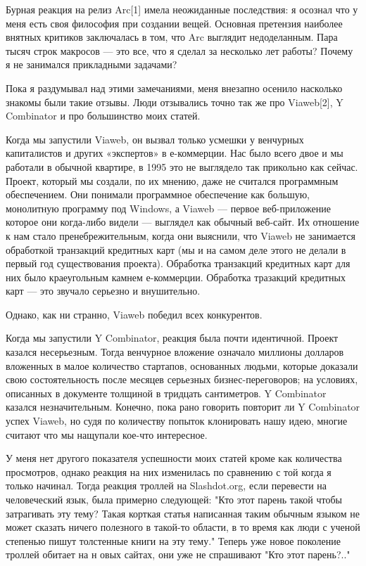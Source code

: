 \documentclass[ebook,12pt,oneside,openany]{memoir}
\author{Пол Грэм} \date{}
\begin{document}
\maketitle

Бурная реакция на релиз Arc[1] имела неожиданные последствия: я
осознал что у меня есть своя философия при создании вещей. Основная
претензия наиболее внятных критиков заключалась в том, что Arc
выглядит недоделанным. Пара тысяч строк макросов — это все, что я
сделал за несколько лет работы? Почему я не занимался прикладными
задачами?


Пока я раздумывал над этими замечаниями, меня внезапно осенило
насколько знакомы были такие отзывы. Люди отзывались точно так же про
Viaweb[2], Y Combinator и про большинство моих статей.

Когда мы запустили Viaweb, он вызвал только усмешки у венчурных
капиталистов и других «экспертов» в е-коммерции. Нас было всего двое и
мы работали в обычной квартире, в 1995 это не выглядело так прикольно
как сейчас. Проект, который мы создали, по их мнению, даже не считался
программным обеспечением. Они понимали программное обеспечение как
большую, монолитную программу под Windows, а Viaweb — первое
веб-приложение которое они когда-либо видели — выглядел как обычный
веб-сайт. Их отношение к нам стало пренебрежительным, когда они
выяснили, что Viaweb не занимается обработкой транзакций кредитных
карт (мы и на самом деле этого не делали в первый год существования
проекта). Обработка транзакций кредитных карт для них было
краеугольным камнем е-коммерции. Обработка тразакций кредитных карт —
это звучало серьезно и внушительно.

Однако, как ни странно, Viaweb победил всех конкурентов.

Когда мы запустили Y Combinator, реакция была почти идентичной. Проект
казался несерьезным. Тогда венчурное вложение означало миллионы
долларов вложенных в малое количество стартапов, основанных людьми,
которые доказали свою состоятельность после месяцев серьезных
бизнес-переговоров; на условиях, описанных в документе толщиной в
тридцать сантиметров. Y Combinator казался незначительным. Конечно,
пока рано говорить повторит ли Y Combinator успех Viaweb, но судя по
количеству попыток клонировать нашу идею, многие считают что мы
нащупали кое-что интересное.

У меня нет другого показателя успешности моих статей кроме как
количества просмотров, однако реакция на них изменилась по сравнению с
той когда я только начинал. Тогда реакция троллей на Slashdot.org,
если перевести на человеческий язык, была примерно следующей: "Кто
этот парень такой чтобы затрагивать эту тему? Такая корткая статья
написанная таким обычным языком не может сказать ничего полезного в
такой-то области, в то время как люди с ученой степенью пишут
толстенные книги на эту тему." Теперь уже новое поколение троллей
обитает на н овых сайтах, они уже не спрашивают "Кто этот парень?.."
\end{document}
